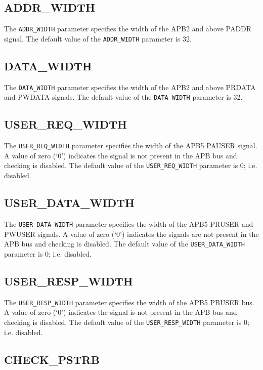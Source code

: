 \subsection{ADDR\_WIDTH}\label{addr_width}

The \texttt{ADDR\_WIDTH} parameter specifies the width of the APB2 and above PADDR signal. The default value of the \texttt{ADDR\_WIDTH} parameter is 32.

\subsection{DATA\_WIDTH}\label{data_width}

The \texttt{DATA\_WIDTH} parameter specifies the width of the APB2 and above PRDATA and PWDATA signals. The default value of the \texttt{DATA\_WIDTH} parameter is 32.

\subsection{USER\_REQ\_WIDTH}\label{user_req_width}

The \texttt{USER\_REQ\_WIDTH} parameter specifies the width of the APB5 PAUSER signal. A value of zero (`0') indicates the signal is not present in the APB bus and checking is disabled. The default value of the \texttt{USER\_REQ\_WIDTH} parameter is 0; i.e. disabled.

\subsection{USER\_DATA\_WIDTH}\label{user_data_width}

The \texttt{USER\_DATA\_WIDTH} parameter specifies the width of the APB5 PRUSER and PWUSER signals. A value of zero (`0') indicates the signals are not present in the APB bus and checking is disabled. The default value of the \texttt{USER\_DATA\_WIDTH} parameter is 0; i.e. disabled.

\subsection{USER\_RESP\_WIDTH}\label{user_resp_width}

The \texttt{USER\_RESP\_WIDTH} parameter specifies the width of the APB5 PBUSER bus. A value of zero (`0') indicates the signal is not present in the APB bus and checking is disabled. The default value of the \texttt{USER\_RESP\_WIDTH} parameter is 0; i.e. disabled.

\subsection{CHECK\_PSTRB}\label{check_pstrb}

